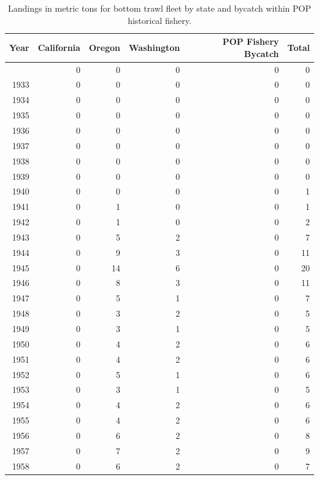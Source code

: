 \documentclass[
]{scrartcl}
\begin{document}
\endgroup

\pagebreak

\newpage{}

\begingroup
\fontsize{9.0pt}{10.8pt}\selectfont

\begin{longtable}{rrrrrr}

\caption{\label{tbl-BT_landings}Landings in metric tons for bottom trawl
fleet by state and bycatch within POP historical fishery.}

\tabularnewline

\toprule
Year & California & Oregon & Washington & POP Fishery Bycatch & Total \\ 
\midrule\addlinespace[2.5pt]
1932 & 0 & 0 & 0 & 0 & 0 \\ 
1933 & 0 & 0 & 0 & 0 & 0 \\ 
1934 & 0 & 0 & 0 & 0 & 0 \\ 
1935 & 0 & 0 & 0 & 0 & 0 \\ 
1936 & 0 & 0 & 0 & 0 & 0 \\ 
1937 & 0 & 0 & 0 & 0 & 0 \\ 
1938 & 0 & 0 & 0 & 0 & 0 \\ 
1939 & 0 & 0 & 0 & 0 & 0 \\ 
1940 & 0 & 0 & 0 & 0 & 1 \\ 
1941 & 0 & 1 & 0 & 0 & 1 \\ 
1942 & 0 & 1 & 0 & 0 & 2 \\ 
1943 & 0 & 5 & 2 & 0 & 7 \\ 
1944 & 0 & 9 & 3 & 0 & 11 \\ 
1945 & 0 & 14 & 6 & 0 & 20 \\ 
1946 & 0 & 8 & 3 & 0 & 11 \\ 
1947 & 0 & 5 & 1 & 0 & 7 \\ 
1948 & 0 & 3 & 2 & 0 & 5 \\ 
1949 & 0 & 3 & 1 & 0 & 5 \\ 
1950 & 0 & 4 & 2 & 0 & 6 \\ 
1951 & 0 & 4 & 2 & 0 & 6 \\ 
1952 & 0 & 5 & 1 & 0 & 6 \\ 
1953 & 0 & 3 & 1 & 0 & 5 \\ 
1954 & 0 & 4 & 2 & 0 & 6 \\ 
1955 & 0 & 4 & 2 & 0 & 6 \\ 
1956 & 0 & 6 & 2 & 0 & 8 \\ 
1957 & 0 & 7 & 2 & 0 & 9 \\ 
1958 & 0 & 6 & 2 & 0 & 7 \\ 

\end{longtable}
\end{document}
